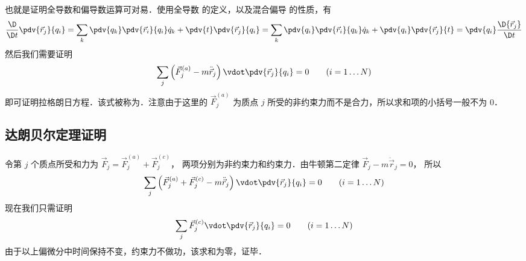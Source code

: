 也就是证明全导数和偏导数运算可对易．使用全导数 的定义，以及混合偏导 的性质，有
\begin{equation}
\frac{\D}{\D t} \pdv{\vec r_j}{q_i} = \sum\limits_k {\pdv{q_k} \pdv{\vec r_i}{q_i} \dot q_k}  + \pdv{t} \pdv{\vec r_j}{q_i} = \sum\limits_k {\pdv{q_i} \pdv{\vec r_i}{q_k} \dot q_k}  + \pdv{q_i} \pdv{\vec r_j}{t} = \pdv{q_i} \frac{\D{{\vec r}_j}}{\D t}
\end{equation}
然后我们需要证明
\begin{equation}
\sum\limits_j {\left( {\vec F_j^{(a)} - m\ddot{\vec r}_j} \right) \vdot \pdv{\vec r_j}{q_i}}  = 0
\qquad (i = 1\dots N)
\end{equation}
即可证明拉格朗日方程．该式被称为．注意由于这里的 $\vec F_j^{(a)}$ 为质点 $j$ 所受的非约束力而不是合力，所以求和项的小括号一般不为 0．

\subsection{达朗贝尔定理证明}
令第 $j$ 个质点所受和力为 $\vec F_j = \vec F_j^{(a)} + \vec F_j^{(c)}$， 两项分别为非约束力和约束力．由牛顿第二定律 $\vec F_j - m\ddot{\vec r}_j = 0$， 所以
\begin{equation}
\sum\limits_j {\left( {\vec F_j^{(a)}+\vec F_j^{(c)} - m\ddot{\vec r}_j} \right) \vdot \pdv{\vec r_j}{q_i}}  = 0
\qquad (i = 1\dots N)
\end{equation}
现在我们只需证明
\begin{equation}
\sum\limits_j { {\vec F_j^{(c)}} \vdot \pdv{\vec r_j}{q_i}}  = 0
\qquad (i = 1\dots N)
\end{equation}
由于以上偏微分中时间保持不变，约束力不做功，该求和为零，证毕．%



